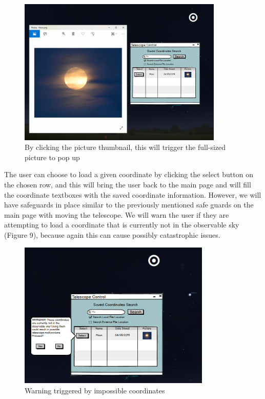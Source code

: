 \documentclass[12pt]{report}
\begin{document}
\newpage

\begin{figure}[h]
	\centering
	\includegraphics[width=0.65\linewidth, height=7.0cm]{SearchClickedPicture}
	\caption{By clicking the picture thumbnail, this will trigger the full-sized picture to pop up}
\end{figure}

The user can choose to load a given coordinate by clicking the select button on the chosen row, and this will bring the user back to the main page and will fill the coordinate textboxes with the saved coordinate information. However, we will have safeguards in place similar to the previously mentioned safe guards on the main page with moving the telescope. We will warn the user if they are attempting to load a coordinate that is currently not in the observable sky (Figure 9), because again this can cause possibly catastrophic issues.

\begin{figure}[h]
	\centering
	\includegraphics[width=0.65\linewidth, height=7.0cm]{SearchwithWarning}
	\caption{Warning triggered by impossible coordinates}
\end{figure}
\end{document}

